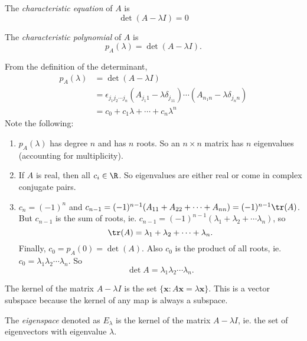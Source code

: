 \documentclass[a4paper]{article}
\begin{document}
    \begin{defi}
      The \emph{characteristic equation} of $A$ is
      \[
        \det(A - \lambda I) = 0
      \]
    \end{defi}

    \begin{defi}
      The \emph{characteristic polynomial} of $A$ is
      \[
        p_A(\lambda) = \det(A - \lambda I).
      \]
    \end{defi}

    From the definition of the determinant,
    \begin{align*}
      p_A(\lambda) &= \det(A - \lambda I)\\
      &= \epsilon_{j_1j_2\cdots j_n} (A_{j_1 1} - \lambda\delta_{j_11})\cdots (A_{n_1 n} - \lambda\delta_{j_nn})\\
      &= c_0 + c_1\lambda + \cdots + c_n\lambda^n
    \end{align*}
    Note the following:
    \begin{enumerate}
      \item $p_A(\lambda)$ has degree $n$ and has $n$ roots. So an $n\times n$ matrix has $n$ eigenvalues (accounting for multiplicity).
      \item If $A$ is real, then all $c_i\in \R$. So eigenvalues are either real or come in complex conjugate pairs.
      \item $c_n = (-1)^n$ and $c_{n - 1} = (-1)^{n - 1}(A_{11} + A_{22} + \cdots + A_{nn}) = (-1)^{n - 1}\tr(A)$. But $c_{n -1}$ is the sum of roots, ie. $c_{n - 1}= (-1)^{n - 1}(\lambda_1 + \lambda_2 + \cdots \lambda_n)$, so
        \[
          \tr(A) = \lambda_1 + \lambda_2 + \cdots + \lambda_n.
        \]
        Finally, $c_0 = p_A(0) = \det(A)$. Also $c_0$ is the product of all roots, ie. $c_0 = \lambda_1\lambda_2\cdots \lambda_n$. So
        \[
          \det A = \lambda_1\lambda_2\cdots \lambda_n.
        \]
    \end{enumerate}

    The kernel of the matrix $A - \lambda I$ is the set $\{\mathbf{x}: A\mathbf{x} = \lambda\mathbf{x}\}$. This is a vector subspace because the kernel of any map is always a subspace.

    \begin{defi}[Eigenspace]
      The \emph{eigenspace} denoted as $E_\lambda$ is the kernel of the matrix $A - \lambda I$, ie. the set of eigenvectors with eigenvalue $\lambda$.
    \end{defi}
\end{document}
